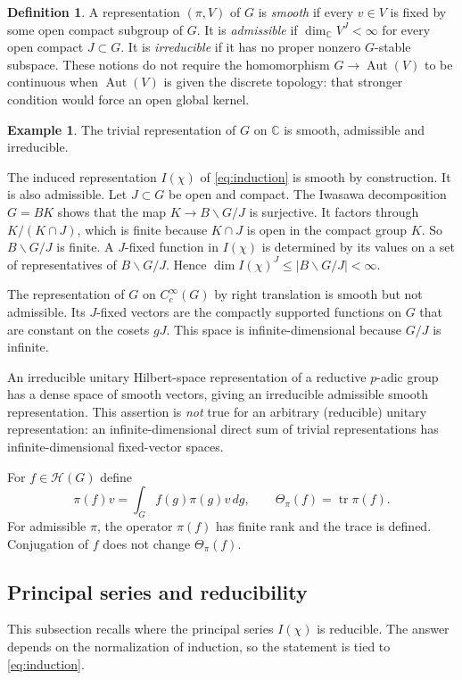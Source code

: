 \documentclass[12pt,letterpaper]{amsart}
\numberwithin{equation}{section}
\theoremstyle{definition}
\newtheorem{definition}[theorem]{Definition}
\newtheorem*{example*}{Example}
\theoremstyle{remark}
\newcommand{\calH}{\mathcal H}
\newcommand{\tr}{\operatorname{tr}}
\begin{document}
\begin{definition}
A representation $(\pi,V)$ of $G$ is \emph{smooth} if every $v\in V$ is fixed by some open compact subgroup of $G$. It is \emph{admissible} if $\dim_{\mathbb C}V^J<\infty$ for every open compact $J\subset G$.  It is \emph{irreducible} if it has no proper nonzero $G$-stable subspace.  These notions do not require the homomorphism $G\to\operatorname{Aut}(V)$ to be continuous when $\operatorname{Aut}(V)$ is given the discrete topology: that stronger condition would force an open global kernel.
\end{definition}
\begin{example*}
The trivial representation of $G$ on $\mathbb C$ is smooth, admissible and irreducible.

The induced representation $I(\chi)$ of \eqref{eq:induction} is smooth by construction. It is also admissible. Let $J\subset G$ be open and compact. The Iwasawa decomposition $G=BK$ shows that the map $K\to B\backslash G/J$ is surjective. It factors through $K/(K\cap J)$, which is finite because $K\cap J$ is open in the compact group $K$. So $B\backslash G/J$ is finite. A $J$-fixed function in $I(\chi)$ is determined by its values on a set of representatives of $B\backslash G/J$. Hence $\dim I(\chi)^J\le|B\backslash G/J|<\infty$.

The representation of $G$ on $C_c^\infty(G)$ by right translation is smooth but not admissible. Its $J$-fixed vectors are the compactly supported functions on $G$ that are constant on the cosets $gJ$. This space is infinite-dimensional because $G/J$ is infinite.
\end{example*}
An irreducible unitary Hilbert-space representation of a reductive $p$-adic group has a dense space of smooth vectors, giving an irreducible admissible smooth representation.  This assertion is \emph{not} true for an arbitrary (reducible) unitary representation: an infinite-dimensional direct sum of trivial representations has infinite-dimensional fixed-vector spaces.

For $f\in\calH(G)$ define
\begin{equation}\label{eq:opFT}
\pi(f)v=\int_Gf(g)\pi(g)v\,dg,
\qquad \Theta_\pi(f)=\tr\pi(f).
\end{equation}
For admissible $\pi$, the operator $\pi(f)$ has finite rank and the trace is defined. Conjugation of $f$ does not change $\Theta_\pi(f)$.

\subsection{Principal series and reducibility}
This subsection recalls where the principal series $I(\chi)$ is reducible. The answer depends on the normalization of induction, so the statement is tied to \eqref{eq:induction}.
\end{document}
